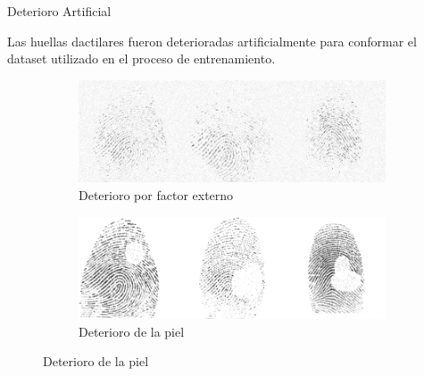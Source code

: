 \documentclass[12pt,aspectratio=169]{beamer}
\begin{document}
\begin{frame}{Deterioro Artificial}

    Las huellas dactilares fueron deterioradas artificialmente para conformar el dataset utilizado en el proceso de entrenamiento.
    \vspace{5mm}

    \begin{figure}
        \begin{subfigure}{0.48\textwidth}
            \centering
            \includegraphics[scale=0.24]{figs/deterioration_2.png}
            \caption{Deterioro por factor externo}
        \end{subfigure}
        \begin{subfigure}{0.48\textwidth}
            \centering
            \includegraphics[scale=0.24]{figs/deterioration_1.png}
            \caption{Deterioro de la piel}
        \end{subfigure}
    \end{figure}

\end{frame}
\end{document}
